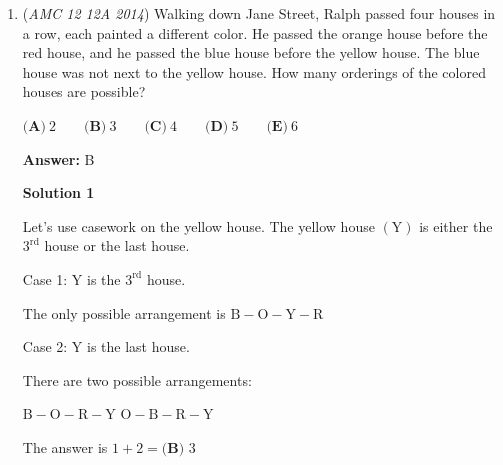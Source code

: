 \begin{enumerate}
 $\textbf{(A) }\$35\qquad \textbf{(B) }\$38.50\qquad \textbf{(C) }\$40\qquad \textbf{(D) }\$42\qquad \textbf{(E) }\$42.50$

 \textbf{Answer: }B



\textbf{Solution}

Suppose $x$ is the price of an adult ticket. The price of a child ticket would be $\frac{x}{2}$.

 
 \begin{eqnarray*} 5x + 4(x/2) = 7x &=& 24.50\\ x &=& 3.50\\ \end{eqnarray*}

 Plug in for 8 adult tickets and 6 child tickets.

 
 \begin{eqnarray*} 8x + 6(x/2) &=& 8(3.50) + 3(3.50)\\  &=&\boxed{\textbf{(B)}\ \ 38.50}\\ \end{eqnarray*}



	\item (\textit{AMC 12 12A 2014}) Walking down Jane Street, Ralph passed four houses in a row, each painted a different color. He passed the orange house before the red house, and he passed the blue house before the yellow house. The blue house was not next to the yellow house. How many orderings of the colored houses are possible?


 $\textbf{(A)}\ 2\qquad\textbf{(B)}\ 3\qquad\textbf{(C)}\ 4\qquad\textbf{(D)}\ 5\qquad\textbf{(E)}\ 6$

 \textbf{Answer: }B



\textbf{Solution 1}

Let's use casework on the yellow house. The yellow house $(\text{Y})$ is either the $3^\text{rd}$ house or the last house.

 Case 1: $\text{Y}$ is the $3^\text{rd}$ house.

 The only possible arrangement is $\text{B}-\text{O}-\text{Y}-\text{R}$

 Case 2: $\text{Y}$ is the last house.

 There are two possible arrangements:

 $\text{B}-\text{O}-\text{R}-\text{Y}$
$\text{O}-\text{B}-\text{R}-\text{Y}$ 

 The answer is $1+2=\boxed{\textbf{(B) } 3}$





\end{enumerate}
